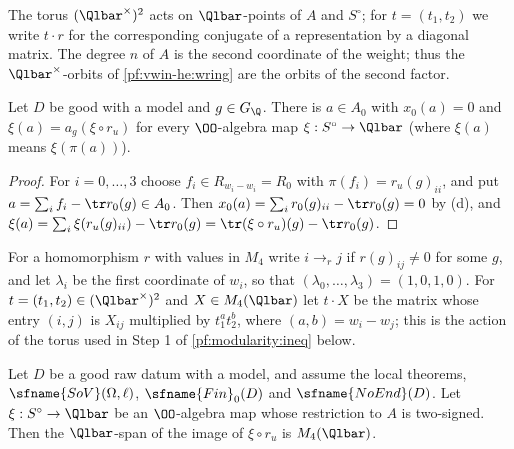 The torus $(\Qlbar^\times)^2$ acts on $\Qlbar$-points of $A$ and $S^\circ$; for $t=(t_1,t_2)$ we write $t\cdot r$ for
the corresponding conjugate of a representation by a diagonal matrix. The degree $n$ of $A$ is the second coordinate
of the weight; thus the $\Qlbar^\times$-orbits of \cref{pf:vwin-he:wring} are the orbits of the second factor.

\begin{lemma}\label{pf:modularity:aelt}
Let $D$ be good with a model and $g\in G_\Q$. There is $a\in A_0$ with $x_0(a)=0$ and $\xi(a)=a_g(\xi\circ r_u)$ for every
$\OO$-algebra map $\xi:S^\circ\to\Qlbar$ (where $\xi(a)$ means $\xi(\pi(a))$).
\end{lemma}

\begin{proof}
For $i=0,\dots,3$ choose $f_i\in R_{w_i-w_i}=R_0$ with $\pi(f_i)=r_u(g)_{ii}$, and put
$a=\sum_if_i-\tr r_0(g)\in A_0$. Then $x_0(a)=\sum_ir_0(g)_{ii}-\tr r_0(g)=0$ by (d), and
$\xi(a)=\sum_i\xi(r_u(g)_{ii})-\tr r_0(g)=\tr(\xi\circ r_u)(g)-\tr r_0(g)$.
\end{proof}

For a homomorphism $r$ with values in $M_4$ write $i\to_rj$ if $r(g)_{ij}\ne0$ for some $g$, and let $\lambda_i$ be the
first coordinate of $w_i$, so that $(\lambda_0,\dots,\lambda_3)=(1,0,1,0)$. For $t=(t_1,t_2)\in(\Qlbar^\times)^2$ and
$X\in M_4(\Qlbar)$ let $t\cdot X$ be the matrix whose entry $(i,j)$ is $X_{ij}$ multiplied by $t_1^{a}t_2^{b}$, where
$(a,b)=w_i-w_j$; this is the action of the torus used in Step 1 of \cref{pf:modularity:ineq} below.

\begin{lemma}\label{pf:modularity:twoirr}
Let $D$ be a good raw datum with a model, and assume the local theorems, $\sfname{SoV}(\Omega,\ell)$, $\sfname{Fin}_0(D)$
and $\sfname{NoEnd}(D)$. Let $\xi:S^\circ\to\Qlbar$ be an $\OO$-algebra map whose restriction to $A$ is two-signed. Then
the $\Qlbar$-span of the image of $\xi\circ r_u$ is $M_4(\Qlbar)$.
\end{lemma}

